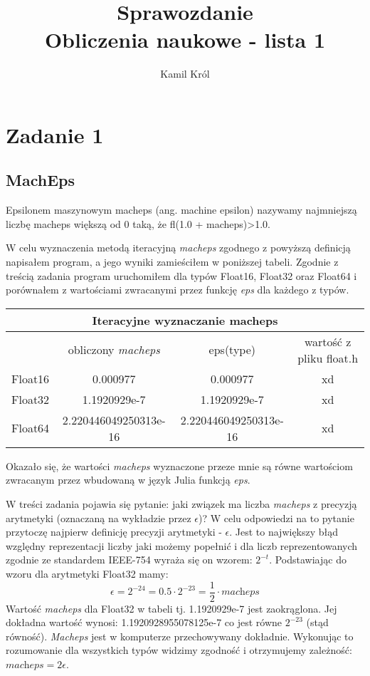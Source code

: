 \documentclass[]{article}
\title{
	Sprawozdanie \\
	\large 
	Obliczenia naukowe - lista 1}
\author{Kamil Król}
\date{}
\begin{document}
	
	\maketitle
	
	\section{Zadanie 1}
	
	\subsection{MachEps}
	Epsilonem maszynowym macheps (ang. machine epsilon) nazywamy najmniejszą liczbę macheps większą od 0 taką, że fl(1.0 + macheps)\textgreater 1.0.
	
	W celu wyznaczenia metodą iteracyjną \textit{macheps} zgodnego z powyższą definicją napisałem program, a jego wyniki zamieściłem w poniższej tabeli. Zgodnie z treścią zadania program uruchomiłem dla typów Float16, Float32 oraz Float64 i porównałem z wartościami zwracanymi przez funkcję \textit{eps} dla każdego z typów.
	
	\begin{table}[h!]
		\centering
		\label{tab:table1}
		\begin{tabular}{|c|c|c|c|}
			\multicolumn{4}{c}{Iteracyjne wyznaczanie macheps}\\
			\hline
			& obliczony \textit{macheps} & eps(type) & wartość z pliku float.h \\
			\hline
			Float16 & 0.000977 & 0.000977 & xd \\
			\hline
			Float32 & 1.1920929e-7 & 1.1920929e-7 & xd \\
			\hline
			Float64 & 2.220446049250313e-16 & 2.220446049250313e-16 & xd \\
			\hline
		\end{tabular}
	\end{table}
	
	Okazało się, że wartości \textit{macheps} wyznaczone przeze mnie są równe wartościom zwracanym przez wbudowaną w język Julia funkcją \textit{eps}.
	
	W treści zadania pojawia się pytanie: jaki związek ma liczba \textit{macheps} z precyzją arytmetyki (oznaczaną na wykładzie przez $\epsilon$)? W celu odpowiedzi na to pytanie przytoczę najpierw definicję precyzji arytmetyki - $\epsilon$. Jest to największy błąd względny reprezentacji liczby jaki możemy popełnić i dla liczb reprezentowanych zgodnie ze standardem IEEE-754 wyraża się on wzorem: \(2^{-t}\). Podstawiając do wzoru dla arytmetyki Float32 mamy: \[\epsilon = 2^{-24} = 0.5 \cdot 2 ^{-23} = \frac{1}{2} \cdot \textit{macheps}\]
	Wartość \textit{macheps} dla Float32 w tabeli tj. 1.1920929e-7 jest zaokrąglona. Jej dokładna wartość wynosi: 1.1920928955078125e-7 co jest równe \(2 ^{-23}\) (stąd równość). \textit{Macheps} jest w komputerze przechowywany dokładnie.
	Wykonując to rozumowanie dla wszystkich typów widzimy zgodność i otrzymujemy zależność: \mbox{\(\textit{macheps} = 2\epsilon\)}.
	
\end{document}

